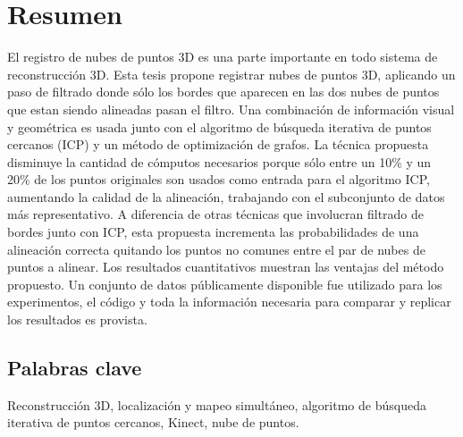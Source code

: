
\chapter*{Resumen}

El registro de nubes de puntos 3D es una parte importante en todo sistema de reconstrucci\'on 3D. Esta tesis propone 
registrar nubes de puntos 3D, aplicando un paso de filtrado donde s\'olo los bordes que aparecen en las dos nubes de puntos 
que estan siendo alineadas pasan el filtro. Una combinaci\'on de informaci\'on visual y geom\'etrica es 
usada junto con el algoritmo de b\'usqueda iterativa de puntos cercanos (ICP) y un m\'etodo de optimizaci\'on de grafos. 
La t\'ecnica propuesta 
disminuye la cantidad de c\'omputos necesarios porque s\'olo entre un 10\% y un 20\% de los puntos originales son usados 
como entrada para el algoritmo ICP, 
aumentando la calidad de la alineaci\'on, trabajando con el subconjunto de datos m\'as representativo. A diferencia de otras 
t\'ecnicas que involucran filtrado de bordes junto con ICP, esta propuesta incrementa las probabilidades de una alineaci\'on 
correcta quitando los puntos no comunes entre el par de nubes de puntos a alinear. Los resultados cuantitativos muestran 
las ventajas del m\'etodo propuesto. Un conjunto de datos p\'ublicamente disponible fue utilizado para los experimentos, el c\'odigo 
y toda la informaci\'on necesaria para comparar y replicar los resultados es provista.


\section*{Palabras clave}


Reconstrucci\'on 3D, localizaci\'on y mapeo simult\'aneo, algoritmo de b\'usqueda iterativa de puntos cercanos, Kinect, nube de puntos.
